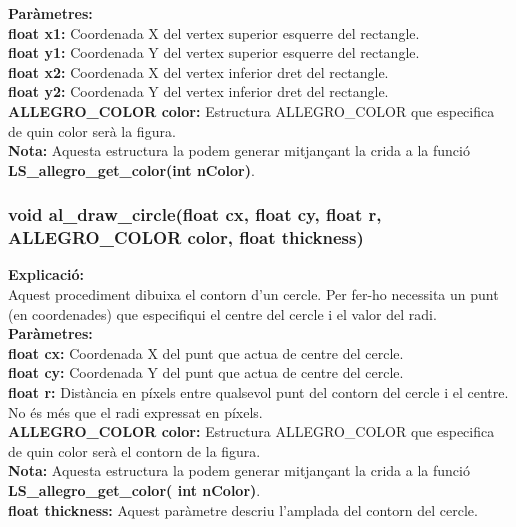 \documentclass[11pt]{article}
\begin{document}
\noindent \textbf{Paràmetres:}\\
\textbf{float x1:} Coordenada X del vertex superior esquerre del rectangle.\\
\textbf{float y1:} Coordenada Y del vertex superior esquerre del rectangle.\\
\textbf{float x2:} Coordenada X del vertex inferior dret del rectangle.\\
\textbf{float y2:} Coordenada Y del vertex inferior dret del rectangle.\\
\textbf{ALLEGRO\_COLOR color:} Estructura ALLEGRO\_COLOR que especifica de quin color serà la figura.\\

\noindent \textbf{Nota:} Aquesta estructura la podem generar mitjançant la crida a la funció \textbf{LS\_allegro\_get\_color(int nColor)}.\\

\newpage	
\subsubsection{void al\_draw\_circle(float cx, float cy, float r, ALLEGRO\_COLOR color, float thickness)}
\textbf{Explicació:}\\
Aquest procediment dibuixa el contorn d'un cercle. Per fer-ho necessita un punt (en coordenades) que especifiqui el centre del cercle i el valor del radi.\\

\noindent \textbf{Paràmetres:}\\
\textbf{float cx:} Coordenada X del punt que actua de centre del cercle.\\
\textbf{float cy:} Coordenada Y del punt que actua de centre del cercle.\\
\textbf{float r:} Distància en píxels entre qualsevol punt del contorn del cercle i el centre. No és més que el radi expressat en píxels.\\
\textbf{ALLEGRO\_COLOR color:} Estructura ALLEGRO\_COLOR que especifica de quin color serà el contorn de la figura. \\

\noindent \textbf{Nota:} Aquesta estructura la podem generar mitjançant la crida a la funció \textbf{LS\_allegro\_get\_color( int nColor)}.\\

\noindent \textbf{float thickness:} Aquest paràmetre descriu l'amplada del contorn del cercle.\\
\end{document}
